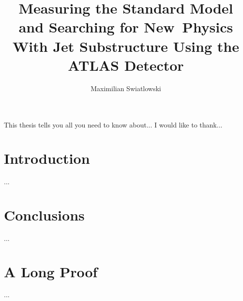 \documentclass{report}
\begin{document}
\title{Measuring the Standard Model and Searching for New~Physics 
        With Jet Substructure Using the ATLAS Detector}
\author{Maximilian Swiatlowski}
 
\beforepreface
{}
    This thesis tells you all you need to know about...
    I would like to thank...
\afterpreface
 
\chapter{Introduction}
         ...
\chapter{Conclusions}
         ...
\appendix
\chapter{A Long Proof}
         ...
%
%
\end{document}
